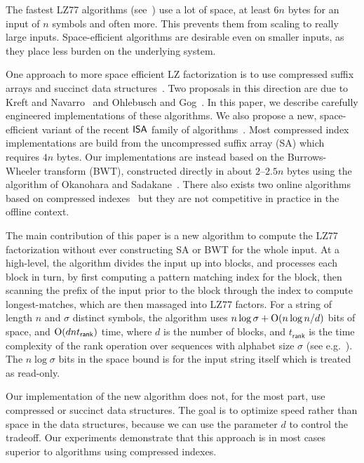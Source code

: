 \documentclass[runningheads]{llncs}
\def\ISA{\mbox{\rm {\sf ISA}}}
\def\rank{\textsf{rank}}
\def\O{\mbox{\rm O}}
\begin{document}
The fastest LZ77 algorithms (see~\cite{kp2013,kkp2013}) use a lot of
space, at least $6n$ bytes for an input of $n$
symbols and often more. This prevents them from scaling to really large
inputs. Space-efficient algorithms are
desirable even on smaller inputs, as they place less burden on the
underlying system.

One approach to more space efficient LZ factorization is to use
compressed suffix arrays and succinct data structures~\cite{nm2007}.
Two proposals in this direction are due to Kreft and
Navarro~\cite{kn2010} and Ohlebusch and Gog~\cite{og2011}.
In this paper, we describe
carefully engineered implementations of these algorithms. 
We also propose a new,
space-efficient variant of the recent $\ISA$ 
family of algorithms~\cite{kp2013}. 
Most compressed index implementations are build from the uncompressed
suffix array (SA) which requires $4n$ bytes. Our implementations are
instead based on
the Burrows-Wheeler transform (BWT), constructed directly in about $2$--$2.5n$
bytes using the algorithm of Okanohara and Sadakane~\cite{os2009}.
There also exists two online algorithms based on compressed
indexes~\cite{os2008,s2012} but they are not competitive in practice
in the offline context.

The main contribution of this paper is a new algorithm to compute the
LZ77 factorization without ever constructing SA or BWT for the whole
input.  At a high-level, the algorithm divides the input up into
blocks, and processes each block in turn, by first computing a pattern
matching index for the block, then scanning the prefix of the input
prior to the block through the index to compute longest-matches, which
are then massaged into LZ77 factors.  For a string of length $n$ and
$\sigma$ distinct symbols, the algorithm uses $n\log\sigma + \O(n\log
n/d)$ bits of space, and $\O(d n t_{\rank})$ time, where $d$ is 
the number of blocks, and $t_{\rank}$
is the time complexity of the rank operation over sequences with
alphabet size $\sigma$ (see e.g.~\cite{bgnn2010}). The $n\log\sigma$
bits in the space bound is for the input string itself which is
treated as read-only.

Our implementation of the new algorithm does not, for the most part,
use compressed or succinct data structures. The goal is to optimize
speed rather than space in the data structures, because we can use the
parameter $d$ to control the tradeoff.
Our experiments demonstrate that this approach is in most cases
superior to algorithms using compressed indexes.
\end{document}
